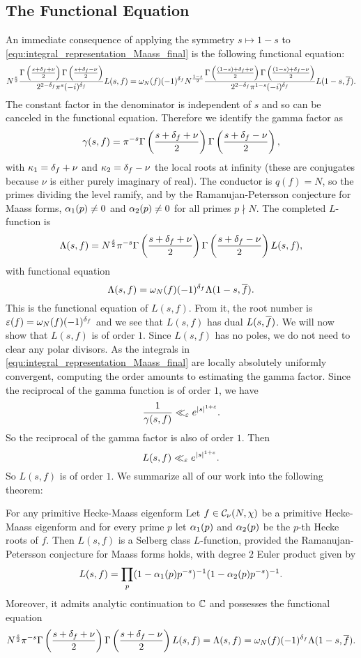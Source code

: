     \subsection*{The Functional Equation}
      An immediate consequence of applying the symmetry $s \mapsto 1-s$ to \cref{equ:integral_representation_Maass_final} is the following functional equation:
      \[
        N^{\frac{s}{2}}\frac{\Gamma\left(\frac{s+\delta_{f}+\nu}{2}\right)\Gamma\left(\frac{s+\delta_{f}-\nu}{2}\right)}{2^{2-\delta_{f}}\pi^{s}(-i)^{\delta_{f}}}L(s,f) = \omega_{N}(f)(-1)^{\delta_{f}}N^{\frac{1-s}{2}}\frac{\Gamma\left(\frac{(1-s)+\delta_{f}+\nu}{2}\right)\Gamma\left(\frac{(1-s)+\delta_{f}-\nu}{2}\right)}{2^{2-\delta_{f}}\pi^{1-s}(-i)^{\delta_{f}}}L(1-s,\overline{f}).
      \]
      The constant factor in the denominator is independent of $s$ and so can be canceled in the functional equation. Therefore we identify the gamma factor as
      \[
        \gamma(s,f) = \pi^{-s}\Gamma\left(\frac{s+\delta_{f}+\nu}{2}\right)\Gamma\left(\frac{s+\delta_{f}-\nu}{2}\right),
      \]
      with $\kappa_{1} = \delta_{f}+\nu$ and $\kappa_{2} = \delta_{f}-\nu$ the local roots at infinity (these are conjugates because $\nu$ is either purely imaginary of real). The conductor is $q(f) = N$, so the primes dividing the level ramify, and by the Ramanujan-Petersson conjecture for Maass forms, $\alpha_{1}(p) \neq 0$ and $\alpha_{2}(p) \neq 0$  for all primes $p \nmid N$. The completed $L$-function is
      \[
        \Lambda(s,f) = N^{\frac{s}{2}}\pi^{-s}\Gamma\left(\frac{s+\delta_{f}+\nu}{2}\right)\Gamma\left(\frac{s+\delta_{f}-\nu}{2}\right)L(s,f),
      \]
      with functional equation
      \[
        \Lambda(s,f) = \omega_{N}(f)(-1)^{\delta_{f}}\Lambda(1-s,\overline{f}).
      \]
      This is the functional equation of $L(s,f)$. From it, the root number is $\varepsilon(f) = \omega_{N}(f)(-1)^{\delta_{f}}$ and we see that $L(s,f)$ has dual $L(s,\overline{f})$. We will now show that $L(s,f)$ is of order $1$. Since $L(s,f)$ has no poles, we do not need to clear any polar divisors. As the integrals in \cref{equ:integral_representation_Maass_final} are locally absolutely uniformly convergent, computing the order amounts to estimating the gamma factor. Since the reciprocal of the gamma function is of order $1$, we have
      \[
        \frac{1}{\gamma(s,f)} \ll_{\varepsilon} e^{|s|^{1+\varepsilon}}.
      \]
      So the reciprocal of the gamma factor is also of order $1$. Then
      \[
        L(s,f) \ll_{\varepsilon} e^{|s|^{1+\varepsilon}}.
      \]
      So $L(s,f)$ is of order $1$. We summarize all of our work into the following theorem:

      \begin{theorem}\label{equ:thm:primitive_Hecke-Maass_Selberg}
        For any primitive Hecke-Maass eigenform Let $f \in \mathcal{C}_{\nu}(N,\chi)$ be a primitive Hecke-Maass eigenform and for every prime $p$ let $\alpha_{1}(p)$ and $\alpha_{2}(p)$ be the $p$-th Hecke roots of $f$. Then $L(s,f)$ is a Selberg class $L$-function, provided the Ramanujan-Petersson conjecture for Maass forms holds, with degree $2$ Euler product given by 
        \[
          L(s,f) = \prod_{p}(1-\alpha_{1}(p)p^{-s})^{-1}(1-\alpha_{2}(p)p^{-s})^{-1}.
        \]
        Moreover, it admits analytic continuation to $\mathbb{C}$ and possesses the functional equation
        \[
          N^{\frac{s}{2}}\pi^{-s}\Gamma\left(\frac{s+\delta_{f}+\nu}{2}\right)\Gamma\left(\frac{s+\delta_{f}-\nu}{2}\right)L(s,f) = \Lambda(s,f) = \omega_{N}(f)(-1)^{\delta_{f}}\Lambda(1-s,\overline{f}).
        \]
      \end{theorem}
